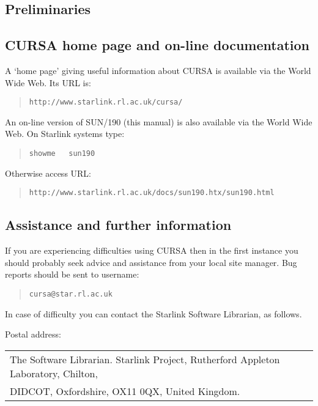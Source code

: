\documentclass[twoside,11pt]{article}
\newcommand{\htmladdnormallink}[2]{#1}
\renewcommand{\_}{\texttt{\symbol{95}}}
\begin{document}
\begin{htmlonly}
\section*{Preliminaries}
\end{htmlonly} 

\subsection*{CURSA home page and on-line documentation}
\label{HOMEPAGE}

A `home page' giving useful information about CURSA is available via
the World Wide Web. Its URL is:

\begin{quote}
\htmladdnormallink{ {\tt http://www.starlink.rl.ac.uk/cursa/}}
{http://www.starlink.rl.ac.uk/cursa/}
\end{quote}

An on-line version of SUN/190 (this manual) is also available via the
World Wide Web.  On Starlink systems type:

\begin{quote}
{\tt showme ~ sun190}
\end{quote}

Otherwise access URL:

\begin{quote}
\htmladdnormallink{
{\tt http://www.starlink.rl.ac.uk/docs/sun190.htx/sun190.html}}
{http://www.starlink.rl.ac.uk/docs/sun190.htx/sun190.html}
\end{quote}


\subsection*{Assistance and further information}

If you are experiencing difficulties using CURSA then in the first
instance you should probably seek advice and assistance from your local
site manager.  Bug reports should be sent to username:

\begin{quote}
{\tt cursa@star.rl.ac.uk}
\end{quote}

In case of difficulty you can contact the Starlink Software
Librarian, as follows.

Postal address: \\
\begin{tabular}{l}
The Software Librarian. Starlink Project, Rutherford Appleton Laboratory, 
  Chilton, \\
DIDCOT, Oxfordshire, OX11 0QX, United Kingdom.                \\
\end{tabular}
\end{document}
